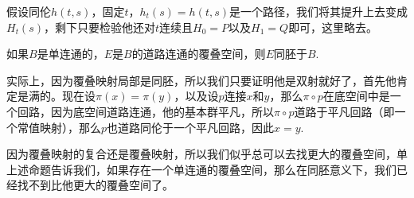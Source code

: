 假设同伦$h(t,s)$，固定$t$，$h_t(s)=h(t,s)$是一个路径，我们将其提升上去变成$H_t(s)$，剩下只要检验他还对$t$连续且$H_0=P$以及$H_1=Q$即可，这里略去。

\para 如果$B$是单连通的，$E$是$B$的道路连通的覆叠空间，则$E$同胚于$B$.

实际上，因为覆叠映射局部是同胚，所以我们只要证明他是双射就好了，首先他肯定是满的。现在设$\pi(x)=\pi(y)$，以及设$p$连接$x$和$y$，那么$\pi\circ p$在底空间中是一个回路，因为底空间道路连通，他的基本群平凡，所以$\pi\circ p$道路于平凡回路（即一个常值映射），那么$p$也道路同伦于一个平凡回路，因此$x=y$.

因为覆叠映射的复合还是覆叠映射，所以我们似乎总可以去找更大的覆叠空间，单上述命题告诉我们，如果存在一个单连通的覆叠空间，那么在同胚意义下，我们已经找不到比他更大的覆叠空间了。
